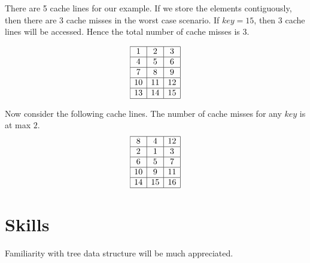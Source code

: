 \documentclass[11pt,a4]{article}
\begin{document}
There are 5 cache lines for our example. If we store the elements contiguously, then there are $3$ cache misses in the worst case scenario. If $key=15$, then $3$ cache lines will be accessed. Hence the total number of cache misses is $3$. 




\[
\begin{array}{|c|c|c|}
\hline
1 & 2 & 3 \\ \hline
4 & 5 & 6 \\ \hline
7 & 8 & 9 \\ \hline
10 & 11 & 12 \\ \hline
13 & 14 & 15 \\ \hline
\end{array}
\]


\newpage

\vspace*{0.5cm}

Now consider the following cache lines. The number of cache misses for any $key$ is at max $2$.  
\[
\begin{array}{|c|c|c|}
\hline
8 & 4 & 12 \\ \hline
2 & 1 & 3 \\ \hline
6 & 5 & 7 \\ \hline
10 & 9 & 11 \\ \hline
14 & 15 & 16 \\ \hline
\end{array}
\]



\section*{Skills}
Familiarity with tree data structure will be much appreciated. 




\end{document}

